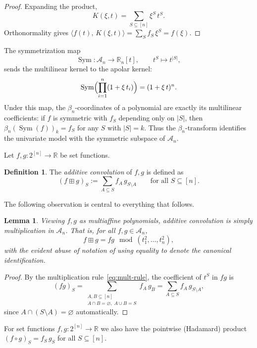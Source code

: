 \documentclass[11pt]{amsart}
\newtheorem{lem}[thm]{Lemma}
\theoremstyle{definition}
\newtheorem{defn}[thm]{Definition}
\newcommand{\R}{\mathbb{R}}
\newcommand{\ip}[2]{\langle #1,\, #2 \rangle}
\DeclareMathOperator{\Sym}{Sym}
\begin{document}
\begin{proof}
Expanding the product,
\[
  K(\xi,t) = \sum_{S\subseteq[n]} \xi^S\, t^S.
\]
Orthonormality gives
$\ip{f(t)}{K(\xi,t)} = \sum_S f_S\,\xi^S = f(\xi)$.
\end{proof}

\bigskip

The symmetrization map
\[
  \Sym:\mathcal{A}_n\longrightarrow\R_n[t],
  \qquad t^S\mapsto t^{|S|},
\]
sends the multilinear kernel to the apolar kernel:
\[
  \Sym\Bigl(\prod_{i=1}^n(1+\xi\, t_i)\Bigr) = (1+\xi\, t)^n.
\]
Under this map, the $\beta_n$-coordinates of a polynomial are exactly its multilinear coefficients: if $f$ is symmetric with $f_S$ depending only on $|S|$, then $\beta_n(\Sym(f))_k = f_S$ for any $S$ with $|S|=k$.
Thus the $\beta_n$-transform identifies the univariate model with the symmetric subspace of $\mathcal{A}_n$.

\bigskip

Let $f,g: 2^{[n]}\to \mathbb R$ be set functions.

\begin{defn}\label{def:add-conv-ml}
The \emph{additive convolution} of $f,g$ is defined as
\[
  (f\boxplus g)_S
  := \sum_{A\subseteq S} f_A\, g_{S\setminus A}
  \qquad\text{for all }S\subseteq[n].
\]
\end{defn}

The following observation is central to everything that follows.

\begin{lem}\label{lem:boxplus-is-product}
Viewing $f,g$ as multiaffine polynomials, additive convolution is simply multiplication in
$\mathcal{A}_n$. That is, for all $f,g\in\mathcal{A}_n$,
\[
  f\boxplus g = fg \mod (t_1^2,\dots,t_n^2),
\]
with the evident abuse of notation of using equality to denote the canonical identification.
\end{lem}

\begin{proof}
By the multiplication rule~\eqref{eq:mult-rule}, the coefficient
of $t^S$ in $fg$ is
\[
  (fg)_S = \sum_{\substack{A,B\subseteq[n]\\
  A\cap B=\varnothing,\; A\cup B = S}} f_A\, g_B
  = \sum_{A\subseteq S} f_A\, g_{S\setminus A},
\]
since $A\cap(S\setminus A)=\varnothing$ automatically.
\end{proof}

For set functions $f,g: 2^{[n]}\to\mathbb R$ we also have the pointwise (Hadamard) product $(f\circ g)_S = f_S\, g_S$ for all $S\subseteq [n]$.
\end{document}
